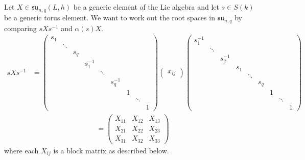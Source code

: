 \documentclass[12pt]{article}
\theoremstyle{definition}
\numberwithin{theorem}{subsection}
\newcommand{\inv}{^{-1}}
\newcommand{\fraksu}{\mathfrak{su}}
\begin{document}
Let $X \in \fraksu_{n,q}(L,h)$ be a generic element of the Lie algebra and let $s \in S(k)$ be a generic torus element. We want to work out the root spaces in $\fraksu_{n,q}$ by comparing $sXs \inv$ and $\alpha(s) X$.
\begin{align*}
	sXs \inv &=
	\begin{pmatrix}
		s_1 \\
		& \ddots \\
		&& s_q \\
		&&& s_1 \inv \\
		&&&& \ddots \\
		&&&&& s_q \inv \\
		&&&&&& 1 \\
		&&&&&&& \ddots \\
		&&&&&&&& 1
	\end{pmatrix}
	\begin{pmatrix}
		x_{ij}
	\end{pmatrix}
	\begin{pmatrix}
		s_1 \inv \\
		& \ddots \\
		&& s_q \inv \\
		&&& s_1 \\
		&&&& \ddots \\
		&&&&& s_q  \\
		&&&&&& 1 \\
		&&&&&&& \ddots \\
		&&&&&&&& 1
	\end{pmatrix}
\end{align*}
\begin{align*}
	= 
	\begin{pmatrix}
		X_{11} & X_{12} & X_{13} \\
		X_{21} & X_{22} & X_{23} \\
		X_{31} & X_{32} & X_{33}
	\end{pmatrix}
\end{align*}
where each $X_{ij}$ is a block matrix as described below.
\end{document}

